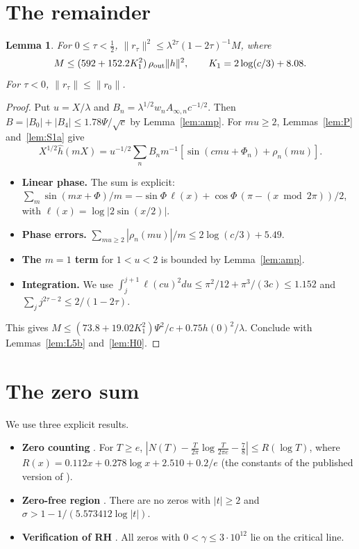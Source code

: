 \documentclass[11pt]{amsart}
\newtheorem{lemma}[proposition]{Lemma}
\theoremstyle{remark}
\numberwithin{equation}{section}
\begin{document}
\section{The remainder}\label{sec:r}

\begin{lemma}\label{lem:S1b}
For $0\le\tau<\frac12$, $\|r_\tau\|^2\le\lambda^{2\tau}(1-2\tau)^{-1}M$, where
\[
M\le(592+152.2K_1^2)\,\rho_{\rm out}\|h\|^2,\qquad K_1=2\log(c/3)+8.08.
\]
For $\tau<0$, $\|r_\tau\|\le\|r_0\|$.
\end{lemma}
\begin{proof}
Put $u=X/\lambda$ and $B_n=\lambda^{1/2}w_nA_{\infty,n}c^{-1/2}$. Then $B=|B_0|+|B_4|\le1.78\Psi/\sqrt c$ by Lemma~\ref{lem:amp}. For $mu\ge2$, Lemmas~\ref{lem:P} and~\ref{lem:S1a} give
\[
X^{1/2}\hat h(mX)=u^{-1/2}\sum_nB_nm^{-1}[\sin(cmu+\Phi_n)+\rho_n(mu)].
\]
\begin{itemize}
\item \textbf{Linear phase.} The sum is explicit: $\sum_m\sin(mx+\Phi)/m=-\sin\Phi\,\ell(x)+\cos\Phi\,(\pi-(x\bmod2\pi))/2$, with $\ell(x)=\log|2\sin(x/2)|$.
\item \textbf{Phase errors.} $\sum_{mu\ge2}|\rho_n(mu)|/m\le2\log(c/3)+5.49$.
\item \textbf{The $m=1$ term} for $1<u<2$ is bounded by Lemma~\ref{lem:amp}.
\item \textbf{Integration.} We use $\int_j^{j+1}\ell(cu)^2du\le\pi^2/12+\pi^3/(3c)\le1.152$ and $\sum_jj^{2\tau-2}\le2/(1-2\tau)$.
\end{itemize}
This gives $M\le(73.8+19.02K_1^2)\Psi^2/c+0.75h(0)^2/\lambda$. Conclude with Lemmas~\ref{lem:L5b} and~\ref{lem:H0}.
\end{proof}

\section{The zero sum}\label{sec:zeros}

We use three explicit results.
\begin{itemize}
\item \textbf{Zero counting} \cite[Cor.~1]{Trudgian14}. For $T\ge e$, $|N(T)-\frac T{2\pi}\log\frac T{2\pi e}-\frac78|\le R(\log T)$, where $R(x)=0.112x+0.278\log x+2.510+0.2/e$ (the constants of the published version of \cite{Trudgian14}).
\item \textbf{Zero-free region} \cite[Thm.~1]{MT15}. There are no zeros with $|t|\ge2$ and $\sigma>1-1/(5.573412\log|t|)$.
\item \textbf{Verification of RH} \cite{PT21}. All zeros with $0<\gamma\le3\cdot10^{12}$ lie on the critical line.
\end{itemize}
\end{document}
